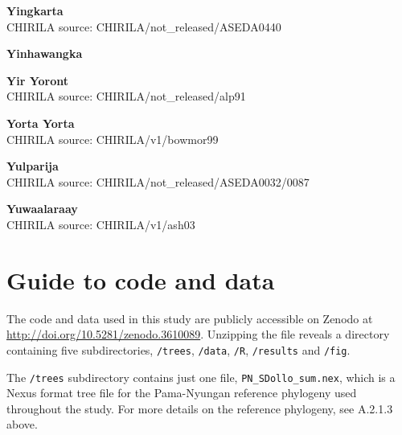 
\textbf{Yingkarta}\\
CHIRILA source: CHIRILA/not\_released/ASEDA0440


\textbf{Yinhawangka}\\

\textbf{Yir Yoront}\\
CHIRILA source: CHIRILA/not\_released/alp91


\textbf{Yorta Yorta}\\
CHIRILA source: CHIRILA/v1/bowmor99


\textbf{Yulparija}\\
CHIRILA source: CHIRILA/not\_released/ASEDA0032/0087


\textbf{Yuwaalaraay}\\
CHIRILA source: CHIRILA/v1/ash03


\newpage

\hypertarget{guide-to-code-and-data}{%
\section{Guide to code and data}\label{guide-to-code-and-data}}

The code and data used in this study are publicly accessible on Zenodo
at \url{http://doi.org/10.5281/zenodo.3610089}. Unzipping the file
reveals a directory containing five subdirectories, \texttt{/trees},
\texttt{/data}, \texttt{/R}, \texttt{/results} and \texttt{/fig}.

The \texttt{/trees} subdirectory contains just one file,
\texttt{PN\_SDollo\_sum.nex}, which is a Nexus format tree file for the
Pama-Nyungan reference phylogeny used throughout the study. For more
details on the reference phylogeny, see A.2.1.3 above.

